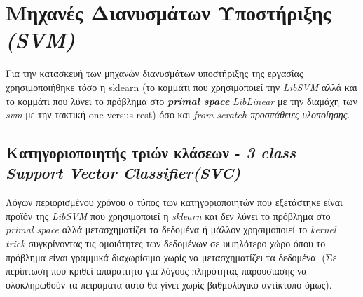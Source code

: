 \documentclass[10pt,a4paper,]{article}
\begin{document}
\section{Μηχανές Διανυσμάτων Υποστήριξης \textit{(SVM)}}
Για την κατασκευή των μηχανών διανυσμάτων υποστήριξης της εργασίας χρησιμοποιήθηκε τόσο η sklearn (το κομμάτι που χρησιμοποιεί την \textit{LibSVM} αλλά και το κομμάτι που λύνει το πρόβλημα στο \textit{\textbf{primal space}} \textit{LibLinear} με την διαμάχη των \textit{svm} με την τακτική one versus rest) όσο και \textit{from scratch προσπάθειες υλοποίησης}.
\subsection{Κατηγοριοποιητής τριών κλάσεων - \textit{3 class Support Vector Classifier(SVC)}}
Λόγων περιορισμένου χρόνου ο τύπος των κατηγοριοποιητών που εξετάστηκε είναι προϊόν της \textit{LibSVM} που χρησιμοποιεί η \textit{sklearn} και δεν λύνει το πρόβλημα στο \textit{primal space }αλλά μετασχηματίζει τα δεδομένα ή μάλλον χρησιμοποιεί το \textit{kernel trick} συγκρίνοντας τις ομοιότητες των δεδομένων σε υψηλότερο χώρο όπου το πρόβλημα είναι γραμμικά διαχωρίσιμο χωρίς να μετασχηματίζει τα δεδομένα. (Σε περίπτωση που κριθεί απαραίτητο για λόγους πληρότητας παρουσίασης να ολοκληρωθούν τα πειράματα αυτό θα γίνει χωρίς βαθμολογικό αντίκτυπο όμως).
\end{document}
